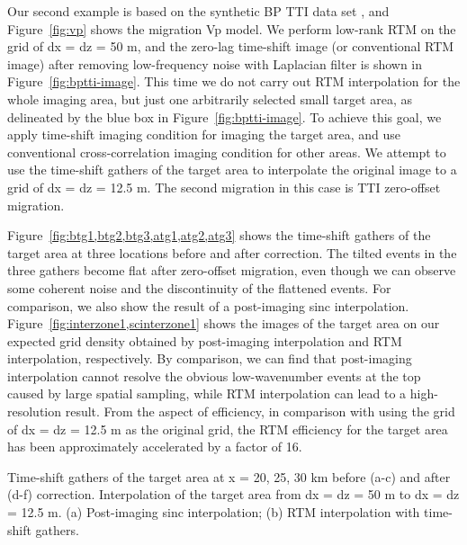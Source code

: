 Our second example is based on the synthetic BP TTI data set \cite[]{shah07}, and Figure~\ref{fig:vp} shows the migration Vp model.
We perform low-rank RTM \cite[]{fomel13,sun16} on the grid of dx = dz = 50 m, 
and the zero-lag time-shift image (or conventional RTM image) after removing low-frequency noise with Laplacian filter is shown in Figure~\ref{fig:bptti-image}.
This time we do not carry out RTM interpolation for the whole imaging area,
but just one arbitrarily selected small target area, as delineated by the blue box in Figure~\ref{fig:bptti-image}.
To achieve this goal, we apply time-shift imaging condition for imaging the target area, 
and use conventional cross-correlation imaging condition for other areas.
We attempt to use the time-shift gathers of the target area to interpolate the original image to a grid of dx = dz = 12.5 m.
The second migration in this case is TTI zero-offset migration.

Figure~\ref{fig:btg1,btg2,btg3,atg1,atg2,atg3} shows the time-shift gathers of the target area at three locations before and after correction.
The tilted events in the three gathers become flat after zero-offset migration, even though we can observe some coherent noise and the discontinuity of the flattened events.
For comparison, we also show the result of a post-imaging sinc interpolation.
Figure~\ref{fig:interzone1,scinterzone1} shows the images of the target area on our expected grid density 
obtained by post-imaging interpolation and RTM interpolation, respectively.
By comparison, we can find that post-imaging interpolation cannot resolve 
the obvious low-wavenumber events at the top caused by large spatial sampling,
while RTM interpolation can lead to a high-resolution result.
From the aspect of efficiency, in comparison with using the grid of dx = dz = 12.5 m as the original grid, the RTM efficiency for the target area has been approximately accelerated by a factor of 16.

{Time-shift gathers of the target area at x = 20, 25, 30 km before (a-c) and after (d-f) correction.}
{Interpolation of the target area from dx = dz = 50 m to dx = dz = 12.5 m. 
(a) Post-imaging sinc interpolation; (b) RTM interpolation with time-shift gathers.}

